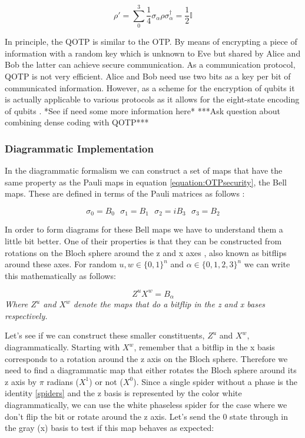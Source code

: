 \documentclass[]{article}
\begin{document}
\begin{equation}
	\label{equation:OTPsecurity}
	\rho' = \sum\limits_0^3 \frac{1}{4} \sigma_\alpha \rho \sigma_\alpha^\dagger = \frac{1}{2}\mathbb{I}
\end{equation}

In principle, the QOTP is similar to the OTP. By means of encrypting a piece of information with a random key which is unknown to Eve but shared by Alice and Bob the latter can achieve secure communication. As a communication protocol, QOTP is not very efficient. Alice and Bob need use two bits as a key per bit of communicated information. However, as a scheme for the encryption of qubits it is actually applicable to various protocols as it allows for the eight-state encoding of qubits \cite{DeVries2016}. *See if need some more information here* ***Ask question about combining dense coding with QOTP***

\subsubsection{Diagrammatic Implementation}

In the diagrammatic formalism we can construct a set of maps that have the same property as the Pauli maps in equation \ref{equation:OTPsecurity}, the Bell maps. These are defined in terms of the Pauli matrices as follows \cite{Coecke2017}:

\begin{equation}
	\sigma_0 = B_0 ~~~ \sigma_1 = B_1 ~~~ \sigma_2 = iB_3 ~~~ \sigma_3 = B_2 
\end{equation}

In order to form diagrams for these Bell maps we have to understand them a little bit better. One of their properties is that they can be constructed from rotations on the Bloch sphere around the z and x axes \cite{DJORDJEVIC2012227}, also known as bitflips around these axes. For random $u, w \in \{0,1\}^n$ and $\alpha \in \{0,1,2,3\}^n$ we can write this mathematically as follows:

\begin{equation}
\label{randombell}
	Z^uX^w = B_\alpha
\end{equation}
\textit{Where $Z^u$ and $X^w$ denote the maps that do a bitflip in the z and x bases respectively.}

Let's see if we can construct these smaller constituents, $Z^u$ and $X^w$, diagrammatically. Starting with $X^w$, remember that a bitflip in the x basis corresponds to a rotation around the z axis on the Bloch sphere. Therefore we need to find a diagrammatic map that either rotates the Bloch sphere around its z axis by $\pi$ radians ($X^1$) or not ($X^0$). Since a single spider without a phase is the identity \ref{spiders} and the z basis is represented by the color white diagrammatically, we can use the white phaseless spider for the case where we don't flip the bit or rotate around the z axis. Let's send the 0 state through in the gray (x) basis to test if this map behaves as expected:
\end{document}
